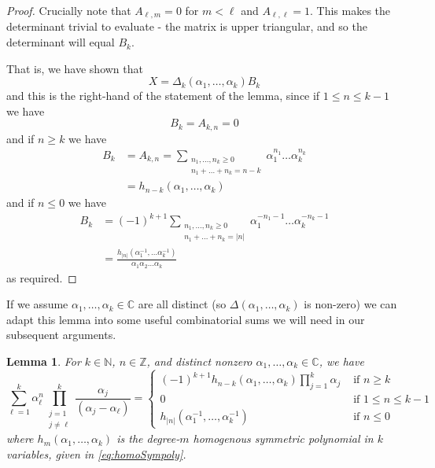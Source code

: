 \documentclass[12pt,a4paper,reqno]{amsart}
\newtheorem{lemma}{Lemma}
\theoremstyle{remark}
\numberwithin{equation}{section}
\begin{document}
\begin{proof}
Crucially note that $A_{\ell,m}=0$ for $m<\ell$ and $A_{\ell,\ell}=1$. This makes the determinant trivial to evaluate - the matrix is upper triangular, and so the determinant will equal $B_k$.

That is, we have shown that
\[
X = \Delta_{k}\left(\alpha_1,\dots,\alpha_{k}\right) B_k
\]
and this is the right-hand of the statement of the lemma, since if $1 \leq n\leq k-1$ we have
\[
B_k = A_{k,n} = 0
\]
and if $n \geq k$ we have
\begin{align*}
B_k &= A_{k,n} = \sum_{\substack{n_1,\dots,n_{k} \geq 0 \\ n_1 + \dots +n_k  = n-k}} \alpha_1^{n_1} \dots \alpha_{k}^{n_k} \\
&= h_{n-k}\left(\alpha_1,\dots,\alpha_k\right)
\end{align*}
and if $n \leq 0$ we have
\begin{align*}
B_k &= (-1)^{k+1} \sum_{\substack{n_1,\dots,n_k \geq 0 \\ n_1 + \dots +n_k = |n|}} \alpha_1^{-n_1-1} \dots \alpha_{k}^{-n_k-1} \\
&= \frac{ h_{|n|}\left(\alpha_1^{-1}, \dots \alpha_k^{-1}\right)}{\alpha_1 \alpha_2 \dots \alpha_k}
\end{align*}
as required.
\end{proof}

If we assume $\alpha_1,\dots,\alpha_k \in \mathbb{C}$ are all distinct (so $\Delta(\alpha_1,\dots,\alpha_k)$ is non-zero) we can adapt this lemma into some useful combinatorial sums we will need in our subsequent arguments.

\begin{lemma}\label{LemmaProdSum}
For $k \in \mathbb{N}$, $n \in \mathbb{Z}$, and distinct nonzero $\alpha_1,\dots,\alpha_k \in \mathbb{C}$, we have
\begin{equation*}
\sum_{\ell=1}^{k} \alpha_\ell^n \prod_{ \substack{j=1 \\ j \neq \ell}}^{k} \frac{\alpha_j}{(\alpha_j - \alpha_\ell)} =
\begin{cases}
\displaystyle (-1)^{k+1} h_{n-k}\left(\alpha_1,\dots,\alpha_k\right) \prod_{j=1}^k \alpha_j & \text{ if } n \geq k\\
0 & \text{ if } 1 \leq n \leq k-1 \\
h_{|n|}\left(\alpha_1^{-1},\dots,\alpha_k^{-1}\right) & \text{ if } n \leq 0
\end{cases}
\end{equation*}
where $h_m(\alpha_1,\dots,\alpha_k)$ is the degree-$m$ homogenous symmetric polynomial in $k$ variables, given in \eqref{eq:homoSympoly}.
\end{lemma}
\end{document}
